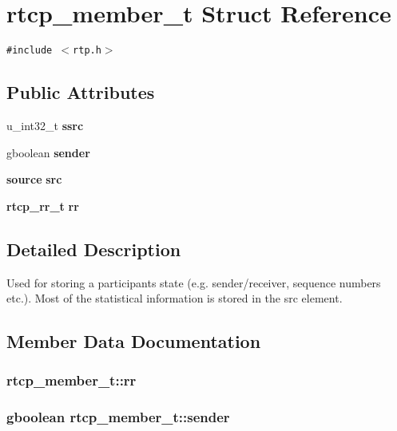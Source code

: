 \section{rtcp\_\-member\_\-t Struct Reference}
\label{structrtcp__member__t}
{\tt \#include $<$rtp.h$>$}

\subsection*{Public Attributes}
\begin{CompactItemize}
\item 
u\_\-int32\_\-t {\bf ssrc}
\item 
gboolean {\bf sender}
\item 
{\bf source} {\bf src}
\item 
{\bf rtcp\_\-rr\_\-t} {\bf rr}
\end{CompactItemize}


\subsection{Detailed Description}
Used for storing a participants state (e.g. sender/receiver, sequence numbers etc.). Most of the statistical information is stored in the src element. 



\subsection{Member Data Documentation}
\subsubsection{ {\bf rtcp\_\-member\_\-t::rr}}\label{structrtcp__member__t_o3}


\subsubsection{\setlength{\rightskip}{0pt plus 5cm}gboolean {\bf rtcp\_\-member\_\-t::sender}}\label{structrtcp__member__t_o1}


